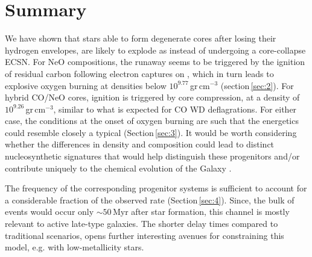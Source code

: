 \documentclass[../../main/thesis_msc.tex]{subfiles}
\begin{document}
\section{Summary}\label{sec:5}
We have shown that stars able to form degenerate \one cores after losing 
their hydrogen  envelopes, are likely to explode as \ias instead of undergoing a core-collapse ECSN. 
For NeO compositions, the runaway seems to be triggered by the ignition of 
residual carbon following electron captures on , which in turn 
leads to explosive oxygen burning at densities below $10^{9.77}$\,gr\,cm$^{-3}$ (section\,\ref{sec:2}). 
For hybrid CO/NeO cores, ignition is triggered by core compression, at a density of $10^{9.26}$\,gr\,cm$^{-3}$, similar to what is expected for CO WD deflagrations. For either case, the conditions at the onset of oxygen burning are such that the energetics  could resemble closely a typical \ias  (Section\,\ref{sec:3}). 
It would be worth considering whether the differences in density and 
composition could lead to distinct nucleosynthetic signatures that would help 
distinguish these progenitors and/or contribute uniquely to the chemical 
evolution of the Galaxy \citep[in analogy to][for ECSNe]{Jones:2018ule}.



The frequency of the corresponding progenitor systems 
is sufficient to account for a considerable fraction of the observed \ia  rate  (Section\,\ref{sec:4}). Since, the bulk of events would occur only $\sim 50$\,Myr after star formation, this channel is mostly relevant to active late-type galaxies. The shorter delay times compared to traditional \ia scenarios, opens further interesting avenues for constraining this model, e.g. with low-metallicity stars.  
\end{document}
